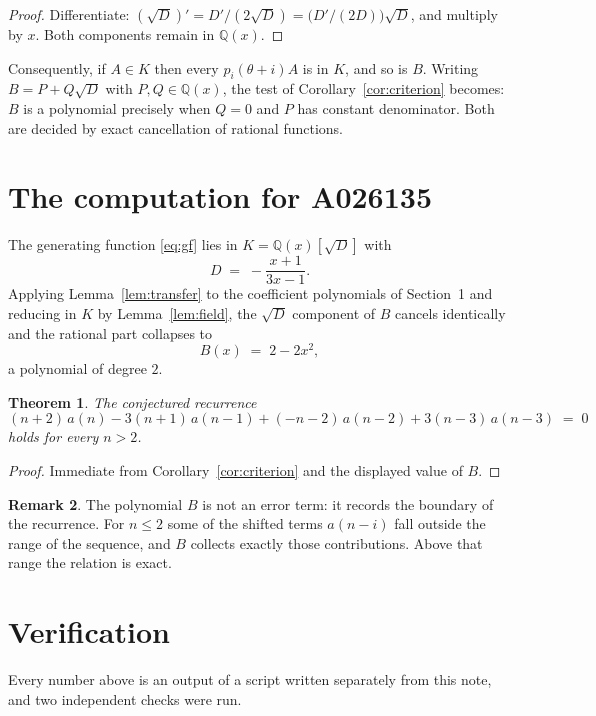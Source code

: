 \documentclass[11pt,a4paper]{article}
\theoremstyle{plain}
\newtheorem{theorem}{Theorem}
\theoremstyle{definition}
\newtheorem{remark}[theorem]{Remark}
\begin{document}
\begin{proof}
Differentiate: $(\sqrt{D})'=D'/(2\sqrt{D})=\bigl(D'/(2D)\bigr)\sqrt{D}$, and multiply by
$x$. Both components remain in $\mathbb{Q}(x)$.
\end{proof}

Consequently, if $A\in K$ then every $p_{i}(\theta+i)A$ is in $K$, and so is $B$. Writing
$B=P+Q\sqrt{D}$ with $P,Q\in\mathbb{Q}(x)$, the test of Corollary~\ref{cor:criterion}
becomes: $B$ is a polynomial precisely when $Q=0$ and $P$ has constant denominator. Both
are decided by exact cancellation of rational functions.

\section{The computation for A026135}

The generating function \eqref{eq:gf} lies in $K=\mathbb{Q}(x)[\sqrt{D}]$ with
\[
D \;=\; - \frac{x + 1}{3 x - 1} .
\]
Applying Lemma~\ref{lem:transfer} to the coefficient polynomials of Section~1 and reducing
in $K$ by Lemma~\ref{lem:field}, the $\sqrt{D}$ component of $B$ cancels identically and
the rational part collapses to
\[
B(x)\;=\;2 - 2 x^{2} ,
\]
a polynomial of degree $2$.

\begin{theorem}
The conjectured recurrence
\[
(n + 2)\,a(n) -  3 \left(n + 1\right)\,a(n-1) + (- n - 2)\,a(n-2) + 3 \left(n - 3\right)\,a(n-3) \;=\;0
\]
holds for every $n>2$.
\end{theorem}

\begin{proof}
Immediate from Corollary~\ref{cor:criterion} and the displayed value of $B$.
\end{proof}

\begin{remark}
The polynomial $B$ is not an error term: it records the boundary of the recurrence. For
$n\le2$ some of the shifted terms $a(n-i)$ fall outside the range of the sequence,
and $B$ collects exactly those contributions. Above that range the relation is exact.
\end{remark}

\section{Verification}

Every number above is an output of a script written separately from this note, and two
independent checks were run.
\end{document}

